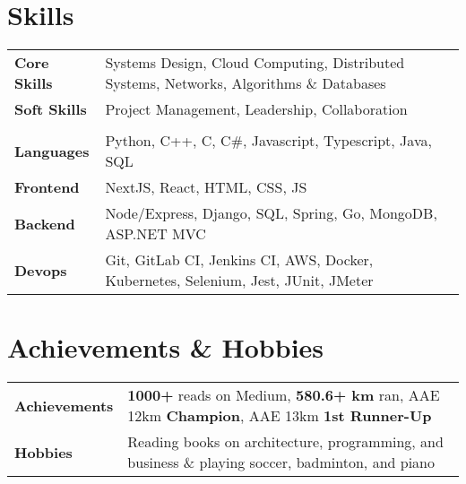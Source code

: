 \documentclass{ExpressiveResume}
\begin{document}
\section{Skills}

\begin{flushleft}
    \begin{tabular}{@{}p{7em}l}
        \textbf{Core Skills} & Systems Design, Cloud Computing, Distributed Systems, Networks, Algorithms \& Databases \\
        \textbf{Soft Skills} & Project Management, Leadership, Collaboration \\
        \\[-0.75em]
        \textbf{Languages} & Python, C++, C, C\#, Javascript, Typescript, Java, SQL \\
        \textbf{Frontend} & NextJS, React, HTML, CSS, JS  \\
        \textbf{Backend} & Node/Express, Django, SQL, Spring, Go, MongoDB, ASP.NET MVC  \\
        \textbf{Devops} & Git, GitLab CI, Jenkins CI, AWS, Docker, Kubernetes, Selenium, Jest, JUnit, JMeter \\
        
    \end{tabular}
\end{flushleft}

\section{Achievements \& Hobbies}
\begin{flushleft}
    \begin{tabular}{@{}p{7em}l}
        \textbf{Achievements} & \textbf{1000+} reads on Medium, \textbf{580.6+ km} ran, AAE 12km \textbf{Champion}, AAE 13km \textbf{1st Runner-Up} \\
        \textbf{Hobbies} & Reading books on architecture, programming, and business \& playing soccer, badminton, and piano \\
    \end{tabular}
\end{flushleft}

    



\end{document}
